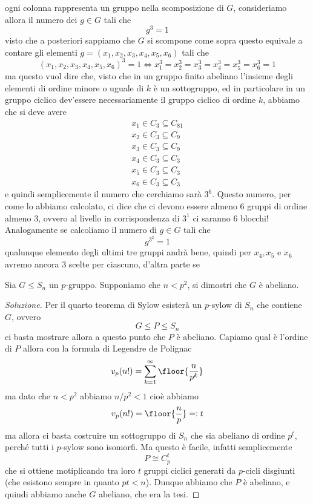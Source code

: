 \documentclass[11pt]{scrartcl}
\begin{document}
\begin{itemize}
\begin{center}
		\end{center}
		ogni colonna rappresenta un gruppo nella scomposizione di $G$, consideriamo allora il numero dei $g\in G$ tali che
		$$g^3=1$$
		visto che a posteriori sappiamo che $G$ si scompone come sopra questo equivale a contare gli elementi $g=(x_1,x_2,x_3,x_4,x_5,x_6)$ tali che
		$$(x_1,x_2,x_3,x_4,x_5,x_6)^3=1 \iff x_1^3=x_2^3=x_3^3=x_4^3=x_5^3=x_6^3=1$$
		ma questo vuol dire che, visto che in un gruppo finito abeliano l'insieme degli elementi di ordine minore o uguale di $k$ è un sottogruppo, ed in particolare in un gruppo ciclico dev'essere necessariamente il gruppo ciclico di ordine $k$, abbiamo che si deve avere
		\begin{gather*}
			x_1\in C_3 \subseteq C_{81} \\
			x_2 \in C_3 \subseteq C_{9} \\
			x_3 \in C_3 \subseteq C_9 \\
			x_4 \in C_3 \subseteq C_3 \\
			x_5 \in C_3 \subseteq C_3 \\
			x_6 \in C_3 \subseteq C_3
		\end{gather*}
		e quindi semplicemente il numero che cerchiamo sarà $3^6$. Questo numero, per come lo abbiamo calcolato, ci dice che ci devono essere almeno $6$ gruppi di ordine almeno $3$, ovvero al livello in corrispondenza di $3^1$ ci saranno $6$ blocchi! Analogamente se calcoliamo il numero di $g\in G$ tali che
		$$g^{3^2}=1$$
		qualunque elemento degli ultimi tre gruppi andrà bene, quindi per $x_4,x_5$ e $x_6$ avremo ancora $3$ scelte per ciascuno, d'altra parte se  
	\end{itemize}
	\begin{exercise}
		Sia $G\le S_n$ un $p$-gruppo. Supponiamo che $n<p^2$, si dimostri che $G$ è abeliano.
	\end{exercise}
	\begin{proof}[Soluzione]
		Per il quarto teorema di Sylow esisterà un $p$-sylow di $S_n$ che contiene $G$, ovvero
		$$G\le P \le S_n$$
		ci basta mostrare allora a questo punto che $P$ è abeliano. Capiamo qual è l'ordine di $P$ allora con la formula di Legendre de Polignac
		$$v_p(n!)=\sum_{k=1}^{\infty}\floor{\frac{n}{p^k}}$$
		ma dato che $n<p^2$ abbiamo $n/p^2<1$ cioè abbiamo
		$$v_p(n!)=\floor{\frac{n}{p}}=:t$$
		ma allora ci basta costruire un sottogruppo di $S_n$ che sia abeliano di ordine $p^t$, perché tutti i $p$-sylow sono isomorfi. Ma questo è facile, infatti semplicemente
		$$P\cong C_p^t$$
		che si ottiene motiplicando tra loro $t$ gruppi ciclici generati da $p$-cicli disgiunti (che esistono sempre in quanto $pt<n$). Dunque abbiamo che $P$ è abeliano, e quindi abbiamo anche $G$ abeliano, che era la tesi.
	\end{proof}
\end{document}
